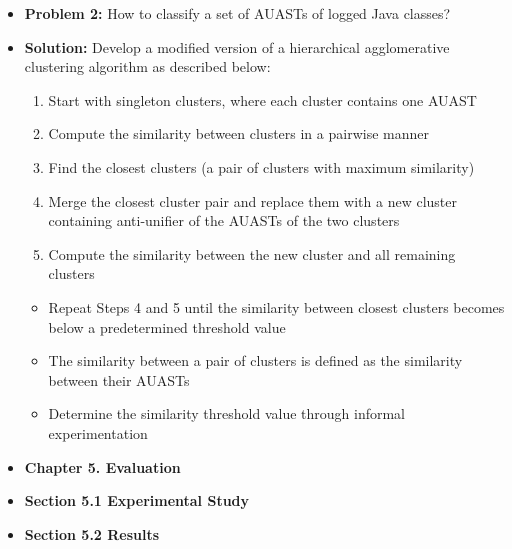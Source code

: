 \documentclass{article}
\newcommand{\bold}{\textbf}
\begin{document}
\begin{itemize} [leftmargin=.1in]
\item \bold{Problem 2: }How to classify a set of AUASTs of logged Java classes?
\item \bold{Solution: }Develop a modified version of a hierarchical agglomerative clustering algorithm as described below:
\begin{enumerate}
\item Start with singleton clusters, where each cluster contains one AUAST
\item Compute the similarity between clusters in a pairwise manner
\item Find the closest clusters (a pair of clusters with maximum similarity)
\item Merge the closest cluster pair and replace them with a new cluster containing anti-unifier of the AUASTs of the two clusters
\item Compute the similarity between the new cluster and all remaining clusters
\end{enumerate}
\begin{itemize}
\item Repeat Steps 4 and 5 until the similarity between closest clusters becomes below a predetermined threshold value
\item The similarity between a pair of clusters is defined as the similarity between their AUASTs
\item Determine the similarity threshold value through informal experimentation
\end{itemize}

\item \bold{Chapter 5. Evaluation}

\item \bold{Section 5.1 Experimental Study}
\item \bold{Section 5.2 Results}


\end{itemize}
\end{document}
